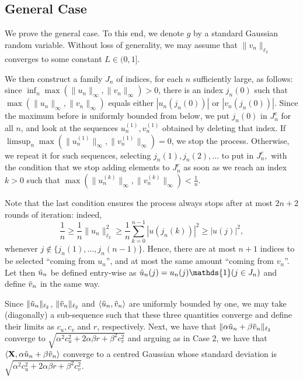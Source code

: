 \documentclass[a4paper,12pt]{amsart}
\numberwithin{equation}{section}
\newcommand{\X}{\mathbf X}
\begin{document}
\subsection{General Case}
We prove the general case. To this end, we denote $g$ by a standard Gaussian random variable. Without loss of generality, we may assume that $\|v_n\|_{\ell_2}$ converges to some constant $L \in (0,1]$. 

We then construct a family $J_n$ of indices, for each $n$ sufficiently large, as follows: since $\inf_n \max(\|u_n\|_{\infty},\|v_n\|_{\infty}) >0$, there is an index $j_n(0)$ such that $\max(\|u_n\|_{\infty},\|v_n\|_{\infty})$ equals either $|u_n(j_n(0))|$ or $|v_n(j_n(0))|$. Since the maximum before is uniformly bounded from below, we put $j_n(0)$ in $J_n^c$ for all $n$, and look at the sequences $u_n^{(1)}, v_n^{(1)}$ obtained by deleting that index. If $\limsup_n \max(\|u_n^{(1)}\|_{\infty},\|v_n^{(1)}\|_{\infty}) = 0$, we stop the process. Otherwise, we repeat it for such sequences, selecting $j_n(1), j_n(2),\dots$ to put in $J_n^c,$ with the condition that we stop adding elements to $J_n^c$ as soon as we reach an index $k > 0$ such that $\max(\|u_n^{(k)}\|_{\infty},\|v_n^{(k)}\|_{\infty}) < \frac{1}{n}$. 

Note that the last condition ensures the process always stops after at most $2n+2$ rounds of iteration: indeed, 
\[
\frac{1}{n} \ge \frac{1}{n} \|u_n\|_{\ell_2}^2 \ge \frac{1}{n} \sum_{k=0}^{n-1} |u(j_n(k))|^2 \ge |u(j)|^2,
\]
whenever $j \not\in\{j_n(1),\dots,j_n(n-1)\}.$ Hence, there are at most $n+1$ indices to be selected ``coming from $u_n$'', and at most the same amount ``coming from $v_n$''. Let then $\Tilde{u}_n$ be defined entry-wise as $\Tilde{u}_n(j) = u_n(j)\mathds{1}(j\in J_n)$ and define $\Tilde{v}_n$ in the same way. 




Since $\|\Tilde{u}_n\|_{\ell_2}$, $\|\Tilde{v}_n\|_{\ell_2}$ and $\langle \Tilde{u}_n,\Tilde{v}_n \rangle$ are uniformly bounded by one,  we may take (diagonally) a sub-sequence such that these three quantities converge and define their limits as $c_u,c_v$ and $r$, respectively. Next, we have that $\|\alpha \Tilde{u}_n + \beta \Tilde{v}_n\|_{\ell_2}$ converge to $\sqrt{\alpha^2 c_u^2 + 2\alpha\beta r + \beta^2 c_v^2}$ and arguing as in Case 2, we have that $\langle \X,\alpha \Tilde{u}_n + \beta \Tilde{v}_n\rangle $ converge to a centred Gaussian whose standard deviation is $\sqrt{\alpha^2 c_u^2 + 2\alpha\beta r + \beta^2 c_v^2}$.
\end{document}
